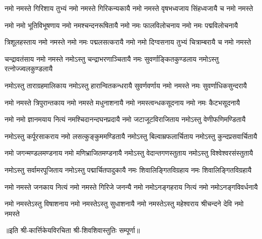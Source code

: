 
\begin{AutoCols}[\maxColumns]
\fourlineindentedshloka
{नमो नमस्ते गिरिशाय तुभ्यं}
{नमो नमस्ते गिरिकन्यकायै}
{नमो नमस्ते वृषभध्वजाय}
{सिंहध्वजायै च नमो नमस्ते}

\fourlineindentedshloka
{नमो नमो भूतिविभूषणाय}
{नमो नमश्चन्दनरूषितायै}
{नमो नमः फालविलोचनाय}
{नमो नमः पद्मविलोचनायै}

\fourlineindentedshloka
{त्रिशूलहस्ताय नमो नमस्ते}
{नमो नमः पद्मलसत्करायै}
{नमो नमो दिग्वसनाय तुभ्यं}
{चित्राम्बरायै च नमो नमस्ते}

\fourlineindentedshloka
{चन्द्रावतंसाय नमो नमस्ते}
{नमोऽस्तु चन्द्राभरणाञ्चितायै}
{नमः सुवर्णाङ्कितकुण्डलाय}
{नमोऽस्तु रत्नोज्ज्वलकुण्डलायै}

\fourlineindentedshloka
{नमोऽस्तु ताराग्रहमालिकाय}
{नमोऽस्तु हारान्वितकन्धरायै}
{सुवर्णवर्णाय नमो नमस्ते}
{नमः सुवर्णाधिकसुन्दरायै}

\fourlineindentedshloka
{नमो नमस्ते त्रिपुरान्तकाय}
{नमो नमस्ते मधुनाशनायै}
{नमो नमस्त्वन्धकसूदनाय}
{नमो नमः कैटभसूदनायै}

\fourlineindentedshloka
{नमो नमो ज्ञानमयाय नित्यं}
{नमश्चिदानन्दघनप्रदायै}
{नमो जटाजूटविराजिताय}
{नमोऽस्तु वेणीफणिमण्डितायै}

\fourlineindentedshloka
{नमोऽस्तु कर्पूरसाकराय}
{नमो लसत्कुङ्कुममण्डितायै}
{नमोऽस्तु बिल्वाम्रफलार्चिताय}
{नमोऽस्तु कुन्दप्रसवार्चितायै}

\fourlineindentedshloka
{नमो जगन्मण्डलमण्डनाय}
{नमो मणिभ्राजितमण्डनायै}
{नमोऽस्तु वेदान्तगणस्तुताय}
{नमोऽस्तु विश्वेश्वरसंस्तुतायै}

\fourlineindentedshloka
{नमोऽस्तु सर्वामरपूजिताय}
{नमोऽस्तु पद्मार्चितपादुकायै}
{नमः शिवालिङ्गितविग्रहाय}
{नमः शिवालिङ्गितविग्रहायै}

\fourlineindentedshloka
{नमो नमस्ते जनकाय नित्यं}
{नमो नमस्ते गिरिजे जनन्यै}
{नमो नमोऽनङ्गहराय नित्यं}
{नमो नमोऽनङ्गविवर्धनायै}

\fourlineindentedshloka
{नमो नमस्तेऽस्तु विषाशनाय}
{नमो नमस्तेऽस्तु सुधाशनायै}
{नमो नमस्तेऽस्तु महेश्वराय}
{श्रीचन्दने देवि नमो नमस्ते}
\end{AutoCols}
॥इति श्री-कार्त्तिकेयविरचिता श्री-शिवशिवास्तुतिः सम्पूर्णा॥